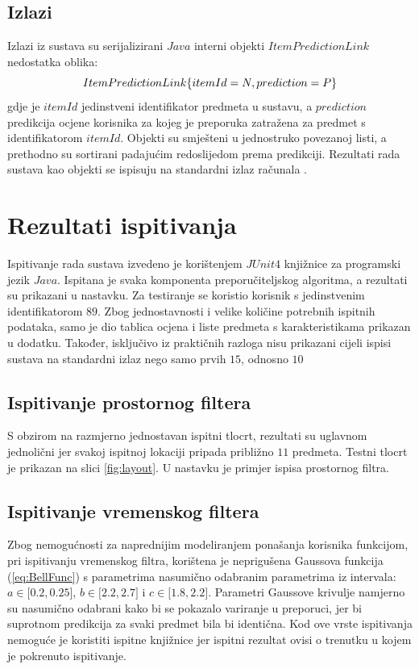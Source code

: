 \documentclass[times, utf8, diplomski, numeric]{fer}
\begin{document}
\subsection{Izlazi}

Izlazi iz sustava su serijalizirani $Java$ interni objekti $ItemPredictionLink$
nedostatka oblika:
\begin{equation}
	\centering
	ItemPredictionLink\{ 
		itemId=N,
		prediction=P
	\}
\end{equation}
gdje je $itemId$ jedinstveni identifikator predmeta u sustavu, a $prediction$
predikcija ocjene korisnika za kojeg je preporuka zatražena za predmet s
identifikatorom $itemId$. Objekti su smješteni u jednostruko povezanoj listi, a
prethodno su sortirani padajućim redoslijedom prema predikciji. Rezultati rada
sustava kao objekti se ispisuju na standardni izlaz računala .

\section{Rezultati ispitivanja}
Ispitivanje rada sustava izvedeno je korištenjem $JUnit 4$ knjižnice za
programski jezik $Java$. Ispitana je svaka komponenta preporučiteljskog
algoritma, a rezultati su prikazani u nastavku.  Za testiranje se koristio
korisnik s jedinstvenim identifikatorom $89$.
Zbog jednostavnosti i velike količine potrebnih ispitnih podataka, samo je dio
tablica ocjena i liste predmeta s karakteristikama prikazan u dodatku. Također,
isključivo iz praktičnih razloga nisu prikazani cijeli ispisi sustava na
standardni izlaz nego samo prvih $15$, odnosno $10$

\subsection{Ispitivanje prostornog filtera}
S obzirom na razmjerno jednostavan ispitni tlocrt, rezultati su uglavnom
jednolični jer svakoj ispitnoj lokaciji pripada približno $11$ predmeta. Testni
tlocrt je prikazan na slici \ref{fig:layout}. U nastavku je primjer ispisa
prostornog filtra.



\subsection{Ispitivanje vremenskog filtera}
Zbog nemogućnosti za naprednijim modeliranjem ponašanja korisnika funkcijom, pri
ispitivanju vremenskog filtra, korištena je neprigušena Gaussova funkcija
(\ref{eq:BellFunc}) s parametrima nasumično odabranim parametrima iz intervala:
$a \in \big[0.2, 0.25 \big]$, 
$b \in \big[2.2, 2.7 \big]$ i 
$c \in \big[1.8, 2.2 \big]$.
Parametri Gaussove krivulje namjerno su nasumično odabrani kako bi se pokazalo
variranje u preporuci, jer bi suprotnom predikcija za svaki predmet bila bi
identična. Kod ove vrste ispitivanja nemoguće je koristiti ispitne knjižnice
jer ispitni rezultat ovisi o trenutku u kojem je pokrenuto ispitivanje.
\end{document}
